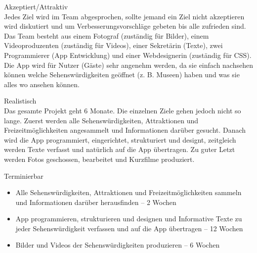 Akzeptiert/Attraktiv\\
Jedes Ziel wird im Team abgesprochen, sollte jemand ein Ziel nicht akzeptieren wird diskutiert und um Verbesserungsvorschläge gebeten bis alle zufrieden sind. Das Team besteht aus einem Fotograf (zuständig für Bilder), einem Videoproduzenten (zuständig für Videos), einer Sekretärin (Texte), zwei Programmierer (App Entwicklung) und einer Webdesignerin (zuständig für CSS). 
Die App wird für Nutzer (Gäste) sehr angenehm werden, da sie einfach nachsehen können welche Sehenswürdigkeiten geöffnet (z. B. Museen) haben und was sie alles wo ansehen können.

Realistisch\\
Das gesamte Projekt geht 6 Monate. Die einzelnen Ziele gehen jedoch nicht so lange. Zuerst werden alle Sehenswürdigkeiten, Attraktionen und Freizeitmöglichkeiten angesammelt und Informationen darüber gesucht. Danach wird die App programmiert, eingerichtet, strukturiert und designt, zeitgleich werden Texte verfasst und natürlich auf die App übertragen. Zu guter Letzt werden Fotos geschossen, bearbeitet und Kurzfilme produziert.

Terminierbar
\begin{itemize}
\item Alle Sehenswürdigkeiten, Attraktionen und Freizeitmöglichkeiten sammeln und Informationen darüber herausfinden – 2 Wochen 
\item App programmieren, strukturieren und designen und Informative Texte zu jeder Sehenswürdigkeit verfassen und auf die App übertragen –  12 Wochen
\item Bilder und Videos der Sehenswürdigkeiten produzieren – 6 Wochen
\end{itemize}

